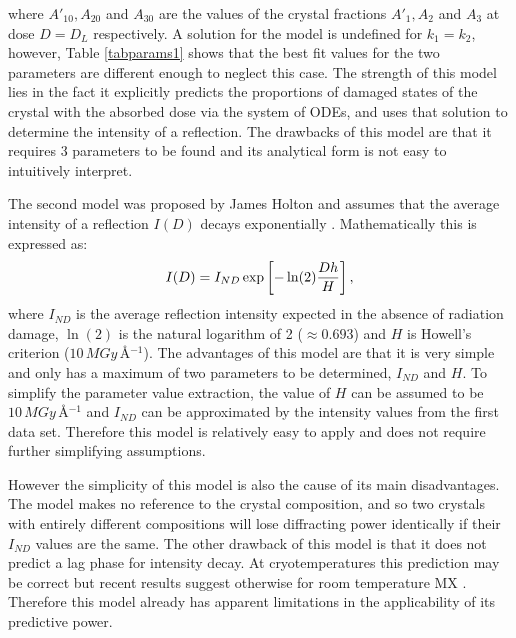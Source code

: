 where $A'_{10}, A_{20}$ and $A_{30}$ are the values of the crystal fractions $A'_{1}, A_{2}$ and $A_{3}$ at dose $D = D_L$ respectively.
A solution for the model is undefined for $k_1 = k_2$, however, Table \ref{tabparams1} shows that the best fit values for the two parameters are different enough to neglect this case. \newline
The strength of this model lies in the fact it explicitly predicts the proportions of damaged states of the crystal with the absorbed dose via the system of ODEs, and uses that solution to determine the intensity of a reflection.
The drawbacks of this model are that it requires 3 parameters to be found and its analytical form is not easy to intuitively interpret.

The second model was proposed by James Holton and assumes that the average intensity of a reflection $I(D)$ decays exponentially \cite{holton2010}. Mathematically this is expressed as:
\begin{equation}
I(D) = I_{ND} \exp \left[ -\ln(2) \frac{Dh}{H} \right],
\label{eq:Holton DDM}
\end{equation}
where $I_{ND}$ is the average reflection intensity expected in the absence of radiation damage, $\ln(2)$ is the natural logarithm of 2 ($\approx 0.693$) and $H$ is Howell's criterion ($10\, MGy\,$\AA$^{-1}$).
The advantages of this model are that it is very simple and only has a maximum of two parameters to be determined, $I_{ND}$ and $H$.
To simplify the parameter value extraction, the value of $H$ can be assumed to be $10\, MGy\,$\AA$^{-1}$ and $I_{ND}$ can be approximated by the intensity values from the first data set.
Therefore this model is relatively easy to apply and does not require further simplifying assumptions.

However the simplicity of this model is also the cause of its main disadvantages.
The model makes no reference to the crystal composition, and so two crystals with entirely different compositions will lose diffracting power identically if their $I_{ND}$ values are the same.
\newline
The other drawback of this model is that it does not predict a lag phase for intensity decay.
At cryotemperatures this prediction may be correct but recent results suggest otherwise for room temperature MX \cite{owen2014}.
Therefore this model already has apparent limitations in the applicability of its predictive power.

